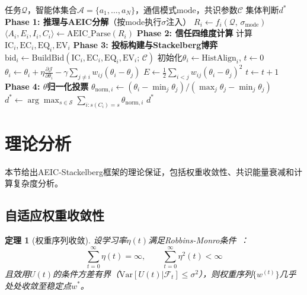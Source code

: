 \documentclass[12pt,a4paper,UTF8,fontset=fandol]{ctexart}
\newtheorem{theorem}{定理}[section]
\begin{document}
\begin{algorithm}[H]
\caption{AEIC-Stackelberg 去中心化语义共识}\label{alg:full}
\begin{algorithmic}[1]
\Require 任务$\mathcal{Q}$，智能体集合$\mathcal{A} = \{a_1, \ldots, a_N\}$，通信模式$\text{mode}$，共识参数$\mathcal{C}$
\Ensure 集体判断$d^*$
\State \textbf{Phase 1: 推理与AEIC分解}（按mode执行$\sigma$注入）
    \State $R_i \gets f_i(\mathcal{Q},\, \sigma_{\text{mode}})$ 
    \State $\langle A_i, E_i, I_i, C_i \rangle \gets \text{AEIC\_Parse}(R_i)$ 
\EndFor
\State \textbf{Phase 2: 信任四维度计算}
    \State 计算$\text{IC}_i, \text{EC}_i, \text{EQ}_i, \text{EV}_i$ 
\EndFor
\State \textbf{Phase 3: 投标构建与Stackelberg博弈}
    \State $\text{bid}_i \gets \text{BuildBid}(\text{IC}_i, \text{EC}_i, \text{EQ}_i, \text{EV}_i;\, \mathcal{C})$ 
\EndFor
\State 初始化$\theta_i \gets \text{HistAlign}_i$, $t \gets 0$
\Repeat
     
        \State $\theta_i \gets \theta_i + \eta \frac{\partial \mathcal{J}}{\partial \theta_i} - \gamma \sum_{j \neq i} w_{ij}(\theta_i - \theta_j)$
    \EndFor
    \State $E \gets \frac{1}{2}\sum_{i<j} w_{ij}(\theta_i - \theta_j)^2$
    \State $t \gets t + 1$
\State \textbf{Phase 4: $\theta$归一化投票}
\State $\theta_{\text{norm},i} \gets (\theta_i - \min_j \theta_j) / (\max_j \theta_j - \min_j \theta_j)$
\State $d^* \gets \arg\max_{s \in \mathcal{S}} \sum_{i: s(C_i)=s} \theta_{\text{norm},i}$
\State \Return $d^*$
\end{algorithmic}
\end{algorithm}

\section{理论分析}\label{sec:theory}

本节给出AEIC-Stackelberg框架的理论保证，包括权重收敛性、共识能量衰减和计算复杂度分析。

\subsection{自适应权重收敛性}

\begin{theorem}[权重序列收敛]\label{thm:convergence}
设学习率$\eta(t)$满足Robbins-Monro条件~\cite{robbins1951stochastic}：
\begin{equation}
\sum_{t=0}^\infty \eta(t) = \infty, \qquad \sum_{t=0}^\infty \eta^2(t) < \infty
\end{equation}
且效用$U(t)$的条件方差有界（$\text{Var}[U(t) | \mathcal{F}_t] \leq \sigma^2$），则权重序列$\{w^{(t)}\}$几乎处处收敛至稳定点$w^*$。
\end{theorem}
\end{document}
